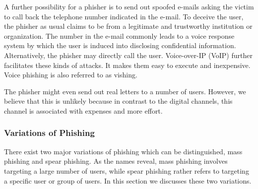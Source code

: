 \begin{description}[leftmargin=0cm]
	\item[Voice Phishing:] A further possibility for a phisher is to send out spoofed e-mails asking the victim to call back the telephone number indicated in the e-mail.
 To deceive the user, the phisher as usual claims to be from a legitimate and trustworthy institution or organization.
 The number in the e-mail commonly leads to a voice response system by which the user is induced into disclosing confidential information.
 Alternatively, the phisher may directly call the user.
 Voice-over-IP (VoIP) further facilitates these kinds of attacks.
 It makes them easy to execute and inexpensive.
 Voice phishing is also referred to as vishing.
 
	\item[Physical letters:] The phisher might even send out real letters to a number of users. However, we believe that this is unlikely because in contrast to the digital channels, this channel is associated with expenses and more effort.

\end{description}

\subsubsection{Variations of Phishing}
There exist two major variations of phishing which can be distinguished, mass phishing and spear phishing.
As the names reveal, mass phishing involves targeting a large number of users, while spear phishing rather refers to targeting a specific user or group of users.
In this section we discusses these two variations.

\label{s:phishing_variations}

